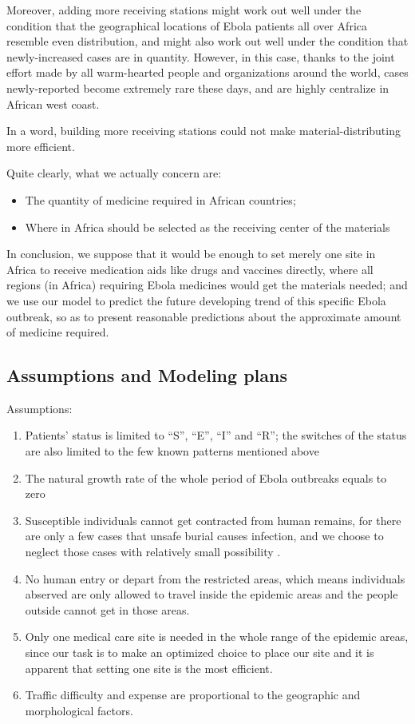 \documentclass[11pt]{article}
\begin{document}
Moreover, adding more receiving stations might work out well under the condition that the geographical locations of Ebola patients all over Africa resemble even distribution, and might also work out well under the condition that newly-increased cases are in quantity. However, in this case, thanks to the joint effort made by all warm-hearted people and organizations around the world, cases newly-reported become extremely rare these days, and are highly centralize in African west coast.

In a word, building more receiving stations could not make material-distributing more efficient.

Quite clearly, what we actually concern are:

\begin{itemize}
\item The quantity of medicine required in African countries;
\item Where in Africa should be selected as the receiving center of the materials
\end{itemize}

In conclusion, we suppose that it would be enough to set merely one site in Africa to receive medication aids like drugs and vaccines directly, where all regions (in Africa) requiring Ebola medicines would get the materials needed; and we use our model to predict the future developing trend of this specific Ebola outbreak, so as to present reasonable predictions about the approximate amount of medicine required.

\subsection{Assumptions and Modeling plans}
Assumptions: 
\begin{enumerate}
\item Patients' status is limited to ``S'', ``E'', ``I'' and ``R''; the switches of the status are also limited to the few known patterns mentioned above
\item The natural growth rate of the whole period of Ebola outbreaks equals to zero
\item Susceptible individuals cannot get contracted from human remains, for there are only a few cases that unsafe burial causes infection, and we choose to neglect those cases with relatively small possibility \cite{Sitrep}.
\item No human entry or depart from the restricted areas, which means individuals abserved are only allowed to travel inside the epidemic areas and the people outside cannot get in those areas.
\item Only one medical care site is needed in the whole range of the epidemic areas, since our task is to make an optimized choice to place our site and it is apparent that setting one site is the most efficient.
\item Traffic difficulty and expense are proportional to the geographic and morphological factors. 
\end{enumerate}
 
\end{document}
